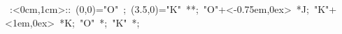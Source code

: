 \hbox{
\xy    <1cm,0cm>:<0cm,1cm>::
       (0,0)="O" ; (3.5,0)="K" **\dir{-};
       "O"+<-0.75em,0ex> *{J};
       "K"+<1em,0ex> *{K};
       "O" *{\bullet};
       "K" *{\bullet};
       \endxy}
